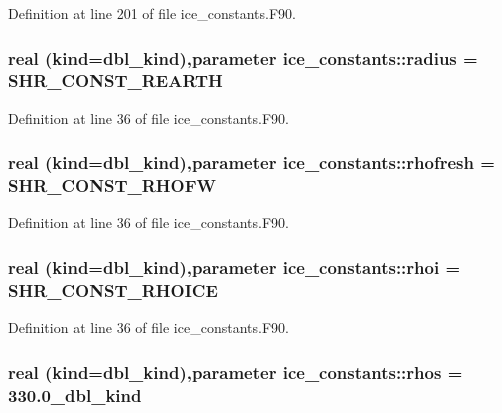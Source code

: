 Definition at line 201 of file ice\_\-constants.F90.\hypertarget{namespaceice__constants_a7ec9d7c0e7bcd12bc711119922edce91}{
\subsubsection[{radius}]{\setlength{\rightskip}{0pt plus 5cm}real (kind=dbl\_\-kind),parameter {\bf ice\_\-constants::radius} = SHR\_\-CONST\_\-REARTH}}
\label{namespaceice__constants_a7ec9d7c0e7bcd12bc711119922edce91}


Definition at line 36 of file ice\_\-constants.F90.\hypertarget{namespaceice__constants_a6aa217bd72fe4e73265e915de96c3665}{
\subsubsection[{rhofresh}]{\setlength{\rightskip}{0pt plus 5cm}real (kind=dbl\_\-kind),parameter {\bf ice\_\-constants::rhofresh} = SHR\_\-CONST\_\-RHOFW}}
\label{namespaceice__constants_a6aa217bd72fe4e73265e915de96c3665}


Definition at line 36 of file ice\_\-constants.F90.\hypertarget{namespaceice__constants_ab8aa44724cb8c314b55a09244600f68d}{
\subsubsection[{rhoi}]{\setlength{\rightskip}{0pt plus 5cm}real (kind=dbl\_\-kind),parameter {\bf ice\_\-constants::rhoi} = SHR\_\-CONST\_\-RHOICE}}
\label{namespaceice__constants_ab8aa44724cb8c314b55a09244600f68d}


Definition at line 36 of file ice\_\-constants.F90.\hypertarget{namespaceice__constants_ae2404a45dc46ecdb371055dd52dcfe1f}{
\subsubsection[{rhos}]{\setlength{\rightskip}{0pt plus 5cm}real (kind=dbl\_\-kind),parameter {\bf ice\_\-constants::rhos} = 330.0\_\-dbl\_\-kind}}
\label{namespaceice__constants_ae2404a45dc46ecdb371055dd52dcfe1f}


